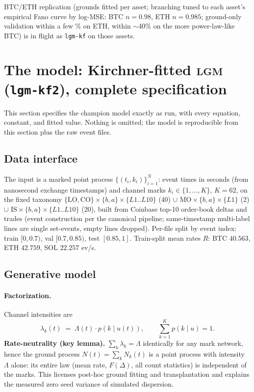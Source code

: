 \documentclass[11pt]{article}
\newcommand{\lgm}{\textsc{lgm}}
\newcommand{\Fano}{F}
\begin{document}
BTC/ETH replication (grounds fitted per asset; branching tuned to each asset's
empirical Fano curve by log-MSE: BTC $n{=}0.98$, ETH $n{=}0.985$; ground-only
validation within a few \% on ETH, within ${\sim}40\%$ on the more power-law-like
BTC) is in flight as \texttt{lgm-kf} on those assets.

\section{The model: Kirchner-fitted \lgm{} (\texttt{lgm-kf2}), complete specification}
\label{sec:model}

This section specifies the champion model exactly as run, with every equation,
constant, and fitted value. Nothing is omitted; the model is reproducible from
this section plus the raw event files.

\subsection{Data interface}
The input is a marked point process $\{(t_i,k_i)\}_{i=1}^{N}$: event times in
seconds (from nanosecond exchange timestamps) and channel marks
$k_i\in\{1,\dots,K\}$, $K=62$, on the fixed taxonomy
$\{\mathrm{LO},\mathrm{CO}\}\times\{b,a\}\times\{L1..L10\}$ (40) $\cup$
$\mathrm{MO}\times\{b,a\}\times\{L1\}$ (2) $\cup$
$\mathrm{IS}\times\{b,a\}\times\{L1..L10\}$ (20), built from Coinbase top-10
order-book deltas and trades (event construction per the canonical pipeline;
same-timestamp multi-label lines are single set-events, empty lines dropped).
Per-file split by event index: train $[0,0.7)$, val $[0.7,0.85)$, test
$[0.85,1]$. Train-split mean rates $R$: BTC $40.563$, ETH $42.759$,
SOL $22.257$ ev/s.

\subsection{Generative model}
\paragraph{Factorization.} Channel intensities are
\begin{equation}
\lambda_k(t) \;=\; \Lambda(t)\cdot p(k\mid u(t)),\qquad
\textstyle\sum_{k=1}^{K} p(k\mid u)=1 .
\label{eq:factorization}
\end{equation}
\textbf{Rate-neutrality (key lemma).} $\sum_k\lambda_k=\Lambda$ identically for
any mark network, hence the ground process $N(t)=\sum_k N_k(t)$ is a point
process with intensity $\Lambda$ alone: its entire law (mean rate,
$\Fano(\Delta)$, all count statistics) is independent of the marks. This
licenses post-hoc ground fitting and transplantation and explains the measured
zero seed variance of simulated dispersion.
\end{document}
